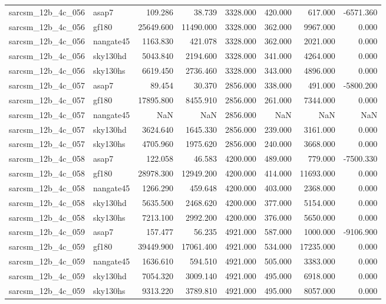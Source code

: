 \begin{tabular}{llrrrrrr}
sarcsm\_12b\_4c\_056 & asap7 & 109.286 & 38.739 & 3328.000 & 420.000 & 617.000 & -6571.360 \\
sarcsm\_12b\_4c\_056 & gf180 & 25649.600 & 11490.000 & 3328.000 & 362.000 & 9967.000 & 0.000 \\
sarcsm\_12b\_4c\_056 & nangate45 & 1163.830 & 421.078 & 3328.000 & 362.000 & 2021.000 & 0.000 \\
sarcsm\_12b\_4c\_056 & sky130hd & 5043.840 & 2194.600 & 3328.000 & 341.000 & 4264.000 & 0.000 \\
sarcsm\_12b\_4c\_056 & sky130hs & 6619.450 & 2736.460 & 3328.000 & 343.000 & 4896.000 & 0.000 \\
sarcsm\_12b\_4c\_057 & asap7 & 89.454 & 30.370 & 2856.000 & 338.000 & 491.000 & -5800.200 \\
sarcsm\_12b\_4c\_057 & gf180 & 17895.800 & 8455.910 & 2856.000 & 261.000 & 7344.000 & 0.000 \\
sarcsm\_12b\_4c\_057 & nangate45 & NaN & NaN & 2856.000 & NaN & NaN & NaN \\
sarcsm\_12b\_4c\_057 & sky130hd & 3624.640 & 1645.330 & 2856.000 & 239.000 & 3161.000 & 0.000 \\
sarcsm\_12b\_4c\_057 & sky130hs & 4705.960 & 1975.620 & 2856.000 & 240.000 & 3668.000 & 0.000 \\
sarcsm\_12b\_4c\_058 & asap7 & 122.058 & 46.583 & 4200.000 & 489.000 & 779.000 & -7500.330 \\
sarcsm\_12b\_4c\_058 & gf180 & 28978.300 & 12949.200 & 4200.000 & 414.000 & 11693.000 & 0.000 \\
sarcsm\_12b\_4c\_058 & nangate45 & 1266.290 & 459.648 & 4200.000 & 403.000 & 2368.000 & 0.000 \\
sarcsm\_12b\_4c\_058 & sky130hd & 5635.500 & 2468.620 & 4200.000 & 377.000 & 5154.000 & 0.000 \\
sarcsm\_12b\_4c\_058 & sky130hs & 7213.100 & 2992.200 & 4200.000 & 376.000 & 5650.000 & 0.000 \\
sarcsm\_12b\_4c\_059 & asap7 & 157.477 & 56.235 & 4921.000 & 587.000 & 1000.000 & -9106.900 \\
sarcsm\_12b\_4c\_059 & gf180 & 39449.900 & 17061.400 & 4921.000 & 534.000 & 17235.000 & 0.000 \\
sarcsm\_12b\_4c\_059 & nangate45 & 1636.610 & 594.510 & 4921.000 & 505.000 & 3383.000 & 0.000 \\
sarcsm\_12b\_4c\_059 & sky130hd & 7054.320 & 3009.140 & 4921.000 & 495.000 & 6918.000 & 0.000 \\
sarcsm\_12b\_4c\_059 & sky130hs & 9313.220 & 3789.810 & 4921.000 & 495.000 & 8057.000 & 0.000 \\

\end{tabular}
